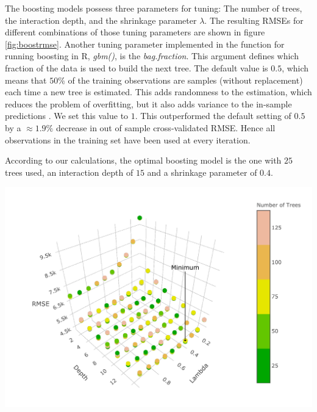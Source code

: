 \documentclass[11pt,]{article}
\let\origfigure\figure
\let\endorigfigure\endfigure
\renewenvironment{figure}[1][2] {
    \expandafter\origfigure\expandafter[H]
} {
    \endorigfigure
}
\begin{document}
The boosting models possess three parameters for tuning: The number of
trees, the interaction depth, and the shrinkage parameter \(\lambda\).
The resulting \ac{RMSE}s for different combinations of those tuning
parameters are shown in figure \ref{fig:boostrmse}. Another tuning
parameter implemented in the function for running boosting in R,
\emph{gbm()}, is the \emph{bag.fraction}. This argument defines which
fraction of the data is used to build the next tree. The default value
is \(0.5\), which means that \(50\%\) of the training observations are
samples (without replacement) each time a new tree is estimated. This
adds randomness to the estimation, which reduces the problem of
overfitting, but it also adds variance to the in-sample predictions
\autocite[Cf.][p. 806.]{Elith2008}. We set this value to \(1\). This
outperformed the default setting of \(0.5\) by a \(\approx1.9\%\)
decrease in out of sample cross-validated \ac{RMSE}. Hence all
observations in the training set have been used at every iteration.

According to our calculations, the optimal boosting model is the one
with \(25\) trees used, an interaction depth of \(15\) and a shrinkage
parameter of \(0.4\).

\begin{figure}

{\centering \includegraphics{../00_data/output_paper/11_boosting_plot} 

}

\caption[RMSEs of the Boosting Model for Different Parameters]{\label{fig:boostrmse}Boosting: Dependency between RMSE, Lambda, the Depths and the Number of Trees that are Grown.}\label{fig:boosting_hyper}
\end{figure}
\end{document}
